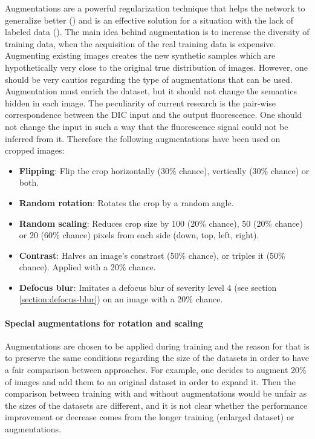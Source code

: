 Augmentations are a powerful regularization technique that helps the network to generalize better (\cite{Perez_Wang_2017}) and is an effective solution for a situation with the lack of labeled data (\cite{Yang_2022}). The main idea behind augmentation is to increase the diversity of training data, when the acquisition of the real training data is expensive. Augmenting existing images creates the new synthetic samples which are hypothetically very close to the original true distribution of images. However, one should be very cautios regarding the type of augmentations that can be used. Augmentation must enrich the dataset, but it should not change the semantics hidden in each image. The peculiarity of current research is the pair-wise correspondence between the DIC input and the output fluorescence. One should not change the input in such a way that the fluorescence signal could not be inferred from it. Therefore the following augmentations have been used on cropped images:

\begin{itemize}
	\item \textbf{Flipping}: Flip the crop horizontally (30\% chance), vertically (30\% chance) or both.
	\item \textbf{Random rotation}: Rotates the crop by a random angle.
	\item \textbf{Random scaling}: Reduces crop size by 100 (20\% chance), 50 (20\% chance) or 20 (60\% chance) pixels from each side (down, top, left, right).
	\item \textbf{Contrast}: Halves an image's constrast (50\% chance), or triples it (50\% chance). Applied with a 20\% chance.
	\item \textbf{Defocus blur}: Imitates a defocus blur of severity level 4 (see section \ref{section:defocus-blur}) on an image with a 20\% chance.
\end{itemize}

\paragraph{Special augmentations for rotation and scaling}

Augmentations are chosen to be applied during training and the reason for that is to preserve the same conditions regarding the size of the datasets in order to have a fair comparison between approaches. For example, one decides to augment 20\% of images and add them to an original dataset in order to expand it. Then the comparison between training with and without augmentations would be unfair as the sizes of the datasets are different, and it is not clear whether the performance improvement or decrease comes from the longer training (enlarged dataset) or augmentations.

